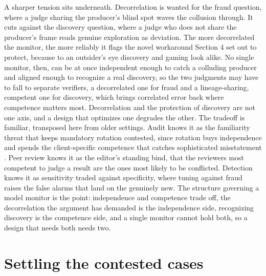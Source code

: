 \documentclass[11pt]{article}
\begin{document}
A sharper tension sits underneath. Decorrelation is wanted for the fraud question, where a judge sharing the producer's blind spot waves the collusion through. It cuts against the discovery question, where a judge who does not share the producer's frame reads genuine exploration as deviation. The more decorrelated the monitor, the more reliably it flags the novel workaround Section 4 set out to protect, because to an outsider's eye discovery and gaming look alike. No single monitor, then, can be at once independent enough to catch a colluding producer and aligned enough to recognize a real discovery, so the two judgments may have to fall to separate verifiers, a decorrelated one for fraud and a lineage-sharing, competent one for discovery, which brings correlated error back where competence matters most. Decorrelation and the protection of discovery are not one axis, and a design that optimizes one degrades the other. The tradeoff is familiar, transposed here from older settings. Audit knows it as the familiarity threat that keeps mandatory rotation contested, since rotation buys independence and spends the client-specific competence that catches sophisticated misstatement \citep{power1997}. Peer review knows it as the editor's standing bind, that the reviewers most competent to judge a result are the ones most likely to be conflicted. Detection knows it as sensitivity traded against specificity, where tuning against fraud raises the false alarms that land on the genuinely new. The structure governing a model monitor is the point: independence and competence trade off, the decorrelation the argument has demanded is the independence side, recognizing discovery is the competence side, and a single monitor cannot hold both, so a design that needs both needs two.

\section{Settling the contested cases}
\end{document}
